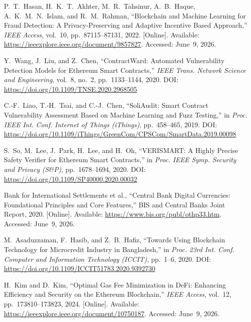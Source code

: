 \documentclass[12pt, a4paper]{report}
\begin{document}
{\begin{enumerate}[label={[\arabic*]}]
\item P.~T.~Hasan, H.~K.~T.~Akhter, M.~R.~Tahsinur, A.~B.~Haque, A.~K.~M.~N.~Islam, and R.~M.~Rahman, ``Blockchain and Machine Learning for Fraud Detection: A Privacy-Preserving and Adaptive Incentive Based Approach,'' \textit{IEEE Access}, vol.~10, pp.~87115--87131, 2022. [Online]. Available: \url{https://ieeexplore.ieee.org/document/9857827}. Accessed: June~9, 2026.

\item Y.~Wang, J.~Liu, and Z.~Chen, ``ContractWard: Automated Vulnerability Detection Models for Ethereum Smart Contracts,'' \textit{IEEE Trans. Network Science and Engineering}, vol.~8, no.~2, pp.~1133--1144, 2020. DOI: \url{https://doi.org/10.1109/TNSE.2020.2968505}

\item C.-F.~Liao, T.-H.~Tsai, and C.-J.~Chen, ``SoliAudit: Smart Contract Vulnerability Assessment Based on Machine Learning and Fuzz Testing,'' in \textit{Proc. IEEE Int. Conf. Internet of Things (iThings)}, pp.~458--465, 2019. DOI: \url{https://doi.org/10.1109/iThings/GreenCom/CPSCom/SmartData.2019.00098}

\item S.~So, M.~Lee, J.~Park, H.~Lee, and H.~Oh, ``VERISMART: A Highly Precise Safety Verifier for Ethereum Smart Contracts,'' in \textit{Proc. IEEE Symp. Security and Privacy (S\&P)}, pp.~1678--1694, 2020. DOI: \url{https://doi.org/10.1109/SP40000.2020.00032}

\item Bank for International Settlements et al., ``Central Bank Digital Currencies: Foundational Principles and Core Features,'' BIS and Central Banks Joint Report, 2020. [Online]. Available: \url{https://www.bis.org/publ/othp33.htm}. Accessed: June~9, 2026.

\item M.~Asaduzzaman, F.~Hasib, and Z.~B.~Hafiz, ``Towards Using Blockchain Technology for Microcredit Industry in Bangladesh,'' in \textit{Proc. 23rd Int. Conf. Computer and Information Technology (ICCIT)}, pp.~1--6, 2020. DOI: \url{https://doi.org/10.1109/ICCIT51783.2020.9392730}

\item H.~Kim and D.~Kim, ``Optimal Gas Fee Minimization in DeFi: Enhancing Efficiency and Security on the Ethereum Blockchain,'' \textit{IEEE Access}, vol.~12, pp.~173810--173823, 2024. [Online]. Available: \url{https://ieeexplore.ieee.org/document/10750187}. Accessed: June~9, 2026.


\end{enumerate}}
\end{document}

